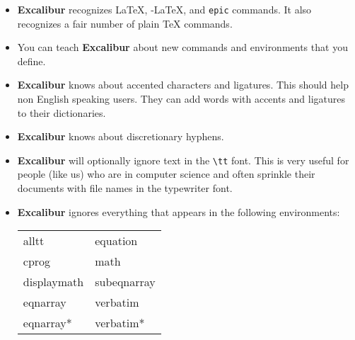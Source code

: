 \documentclass[11pt,titlepage]{article}
\newcommand{\ex}{\textbf{Excalibur}}
\newcommand{\AmS}{\latex{{\protect\the\textfont2
        A\kern-.1667em\lower.5ex\hbox{M}\kern-.125emS}}\html{AMS}}
\begin{document}
\begin{itemize}

\item \ex{} recognizes \LaTeX, \AmS-\LaTeX, and \texttt{epic}
  commands. It also recognizes a fair number of plain \TeX{} commands.

\item You can teach \ex{} about new commands and environments that you
  define.

\item \ex{} knows about accented characters and ligatures. This should
  help non English speaking users. They can add words with accents and
  ligatures to their dictionaries.

\item \ex{} knows about discretionary hyphens.

\item \ex{} will optionally ignore text in the \verb+\tt+ font. This
  is very useful for people (like us) who are in computer science and
  often sprinkle their documents with file names in the typewriter
  font.

\item \ex{} ignores everything that appears in the following
  environments:


  \begin{latexonly}
    \begin{tt}
      \begin{tabular}{ll}
        alltt       & equation    \\
        cprog       & math        \\
        displaymath & subeqnarray \\
        eqnarray    & verbatim    \\
        eqnarray*   & verbatim*
      \end{tabular}
    \end{tt}
  \end{latexonly}


\end{itemize}
\end{document}
